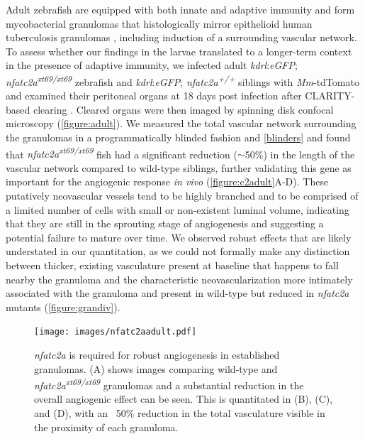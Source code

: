 Adult zebrafish are equipped with both innate and adaptive immunity and form mycobacterial granulomas that histologically mirror epithelioid human tuberculosis granulomas \citep{Swaim2006}, including induction of a surrounding vascular network. To assess whether our findings in the larvae translated to a longer-term context in the presence of adaptive immunity, we infected adult \textit{kdrl}:\textit{eGFP}; \textit{nfatc2a\textsuperscript{xt69/xt69}} zebrafish and \textit{kdrl}:\textit{eGFP}; \textit{nfatc2a\textsuperscript{+/+}} siblings with \textit{Mm}-tdTomato and examined their peritoneal organs at 18 days post infection after CLARITY-based clearing \citep{Chung2013, Cronan2015}. Cleared organs were then imaged by spinning disk confocal microscopy (\autoref{figure:adult}). We measured the total vascular network surrounding the granulomas in a programmatically blinded fashion \citep{Salter2016} and \autoref{blinders} and found that \textit{nfatc2a\textsuperscript{xt69/xt69}} fish had a significant reduction (${\sim}$50\%) in the length of the vascular network compared to wild-type siblings, further validating this gene as important for the angiogenic response \textit{in vivo} (\autoref{figure:c2adult}A-D). These putatively neovascular vessels tend to be highly branched and to be comprised of a limited number of cells with small or non-existent luminal volume, indicating that they are still in the sprouting stage of angiogenesis and suggesting a potential failure to mature over time. We observed robust effects that are likely understated in our quantitation, as we could not formally make any distinction between thicker, existing vasculature present at baseline that happens to fall nearby the granuloma and the characteristic neovascularization more intimately associated with the granuloma and present in wild-type but reduced in \textit{nfatc2a} mutants (\autoref{figure:grandiv}).

\begin{figure}
\centering
\texttt{[image: images/nfatc2aadult.pdf]}
\caption{\textit{nfatc2a} is required for robust angiogenesis in established granulomas. (A) shows images comparing wild-type and \textit{nfatc2a\textsuperscript{xt69/xt69}} granulomas and a substantial reduction in the overall angiogenic effect can be seen. This is quantitated in (B), (C), and (D), with an ~50\% reduction in the total vasculature visible in the proximity of each granuloma.}
\label{figure:c2adult}
\end{figure}

